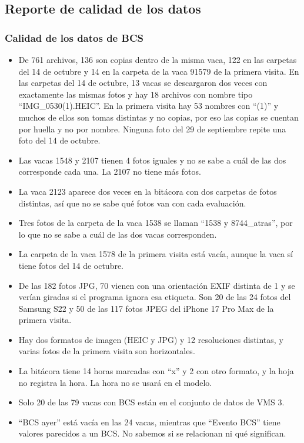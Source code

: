 \subsection{Reporte de calidad de los datos}

\subsubsection*{Calidad de los datos de BCS}

\begin{itemize}
  \item De 761 archivos, 136 son copias dentro de la misma vaca, 122 en las carpetas del 14 de octubre y 14 en la carpeta de la vaca 91579 de la primera visita. En las carpetas del 14 de octubre, 13 vacas se descargaron dos veces con exactamente las mismas fotos y hay 18 archivos con nombre tipo ``IMG\_0530(1).HEIC''. En la primera visita hay 53 nombres con ``(1)'' y muchos de ellos son tomas distintas y no copias, por eso las copias se cuentan por huella y no por nombre. Ninguna foto del 29 de septiembre repite una foto del 14 de octubre.
  \item Las vacas 1548 y 2107 tienen 4 fotos iguales y no se sabe a cuál de las dos corresponde cada una. La 2107 no tiene más fotos.
  \item La vaca 2123 aparece dos veces en la bitácora con dos carpetas de fotos distintas, así que no se sabe qué fotos van con cada evaluación.
  \item Tres fotos de la carpeta de la vaca 1538 se llaman ``1538 y 8744\_atras'', por lo que no se sabe a cuál de las dos vacas corresponden.
  \item La carpeta de la vaca 1578 de la primera visita está vacía, aunque la vaca sí tiene fotos del 14 de octubre.
  \item De las 182 fotos JPG, 70 vienen con una orientación EXIF distinta de 1 y se verían giradas si el programa ignora esa etiqueta. Son 20 de las 24 fotos del Samsung S22 y 50 de las 117 fotos JPEG del iPhone 17 Pro Max de la primera visita.
  \item Hay dos formatos de imagen (HEIC y JPG) y 12 resoluciones distintas, y varias fotos de la primera visita son horizontales.
  \item La bitácora tiene 14 horas marcadas con ``x'' y 2 con otro formato, y la hoja no registra la hora. La hora no se usará en el modelo.
  \item Solo 20 de las 79 vacas con BCS están en el conjunto de datos de VMS 3.
  \item ``BCS ayer'' está vacía en las 24 vacas, mientras que ``Evento BCS'' tiene valores parecidos a un BCS. No sabemos si se relacionan ni qué significan.

\end{itemize}
